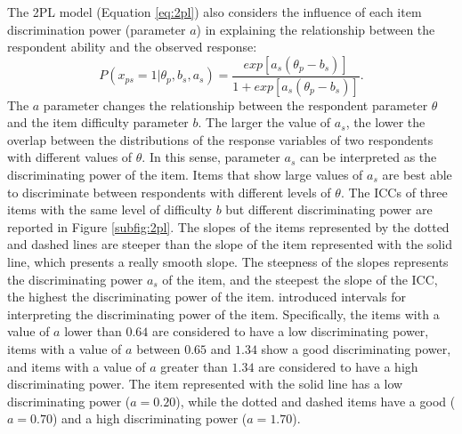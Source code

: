 \documentclass[12pt]{book}
\begin{document}
The 2PL model (Equation \ref{eq:2pl}) \cite{birnbaum1968} also considers the influence of each item discrimination power (parameter $a$) in explaining the relationship between the respondent ability and the observed response: 
\begin{equation}\label{eq:2pl}
	P(x_{ps} = 1 | \theta_p, b_s, a_s) = \frac{exp[a_s(\theta_p - b_s)]}{1 + exp[a_s(\theta_p - b_s)]}.
\end{equation}
The $a$ parameter changes the relationship between the respondent parameter $\theta$ and the item difficulty parameter $b$. The larger the value of $a_s$, the lower the overlap between the distributions of the response variables of two respondents with different values of $\theta$. In this sense, parameter $a_s$ can be interpreted as the discriminating power of the item. Items that show large values of $a_s$ are best able to discriminate between respondents with different levels of $\theta$.
The ICCs of three items with the same level of difficulty $b$ but different discriminating power are reported in Figure \ref{subfig:2pl}. 
	The slopes of the items represented by the dotted and dashed lines are steeper than the slope of the item represented with the solid line, which presents a really smooth slope. 
	The steepness of the slopes represents the discriminating power $a_s$ of the item, and the steepest the slope of the ICC, the highest the discriminating power of the item.   
	 introduced intervals for interpreting the discriminating power of the item. Specifically, the items with a value of $a$ lower than $0.64$ are considered to have a low discriminating power, items with a value of $a$ between $0.65$ and $1.34$ show a good discriminating power, and items with a value of $a$ greater than $1.34$ are considered to have a high discriminating power.
	The item represented with the solid line has a low discriminating power ($a =0.20$), while the dotted and dashed items have a good ($a = 0.70$) and a high discriminating power ($a = 1.70$). 
\end{document}

